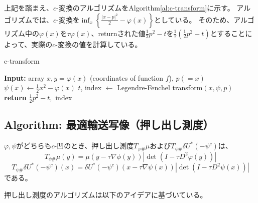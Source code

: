 上記を踏まえ、$c$-変換のアルゴリズムをAlgorithm\ref{al:c-transform}に示す。
アルゴリズムでは、$c$-変換を$\inf_x\left\{\frac{|x-p|^2}{2} - \varphi(x)\right\}$としている。
そのため、アルゴリズム中の$\varphi(x)$を$\tau\varphi(x)$、returnされた値$\frac{1}{2} p^2 - t$を$\frac{1}{\tau}\left(\frac{1}{2} p^2 - t\right)$とすることによって、実際の$c$-変換の値を計算している。

\begin{algorithm}[tb]
    \caption{c-transform}
    \label{al:c-transform}
    \begin{algorithmic}[1]
        \State \textbf{Input:} array $x,y = \varphi(x)$ (coordinates of function $f$), $p(=x)$
        \State $\psi(x) \gets \frac{1}{2} x^2 - \varphi(x)$
        \State $t$, index $\gets$ Legendre-Fenchel transform$(x, \psi, p)$
        \State \textbf{return} $\frac{1}{2} p^2 - t, $ index
    \end{algorithmic}
\end{algorithm}


\subsection{Algorithm: 最適輸送写像（押し出し測度）}
\label{sect:al_pushforward}
$\varphi, \psi$がどちらも$c$-凹のとき、押し出し測度$T_{\varphi \#} \mu$および$T_{\psi \#} \delta U^*(- \psi^c)$は、
\begin{equation*}
    T_{\phi \#} \mu (y) =\mu(y - \tau \nabla \phi(y))|\det (I - \tau D^2 \varphi(y))|
\end{equation*}
\begin{equation*}
    T_{\psi \#} \delta U^* (- \psi^c)(x) =\delta U^* (- \psi^c)(x - \tau \nabla \psi(x))|\det (I - \tau D^2 \psi(x))|
\end{equation*}
である。

押し出し測度のアルゴリズムは以下のアイデアに基づいている。
    
